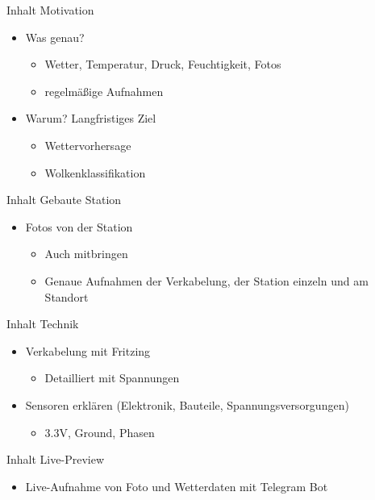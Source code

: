 \begin{frame}[t]{Inhalt Motivation}
  \begin{itemize}[label=+]
    \item Was genau?
      \begin{itemize}[label=-]
        \item Wetter, Temperatur, Druck, Feuchtigkeit, Fotos
        \item regelm\"a{\ss}ige Aufnahmen
      \end{itemize}
    \item Warum? Langfristiges Ziel
      \begin{itemize}[label=-]
        \item Wettervorhersage
        \item Wolkenklassifikation
      \end{itemize}
  \end{itemize}
\end{frame}
\begin{frame}[t]{Inhalt Gebaute Station}
  \begin{itemize}[label=+]
    \item Fotos von der Station
      \begin{itemize}[label=-]
        \item Auch mitbringen
        \item Genaue Aufnahmen der Verkabelung, der Station einzeln und am Standort
      \end{itemize}
  \end{itemize}
\end{frame}
\begin{frame}[t]{Inhalt Technik}
  \begin{itemize}[label=+]
    \item Verkabelung mit Fritzing
      \begin{itemize}
        \item Detailliert mit Spannungen
      \end{itemize}
    \item Sensoren erkl\"aren (Elektronik, Bauteile, Spannungsversorgungen)
      \begin{itemize}
        \item 3.3V, Ground, Phasen
      \end{itemize}
  \end{itemize}
\end{frame}
\begin{frame}[t]{Inhalt Live-Preview}
  \begin{itemize}[label=+]
    \item Live-Aufnahme von Foto und Wetterdaten mit Telegram Bot
  \end{itemize}
\end{frame}

